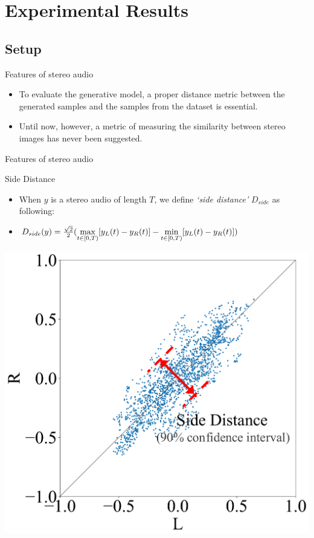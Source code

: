 \section{Experimental Results}
\subsection{Setup}

\begin{frame}{Features of stereo audio}
    \begin{itemize}
        \item To evaluate the generative model, a proper distance metric between the generated samples and the samples from the dataset is essential.
        \bigskip
        \bigskip
        \item Until now, however, a metric of measuring the similarity between stereo images has never been suggested.
    \end{itemize}
    
\end{frame}

\begin{frame}{Features of stereo audio}
    \begin{block}{Side Distance}
        \begin{itemize}
        \item When $y$ is a stereo audio of length $T$, we define \textit{`side distance'} $D_{side}$ as following:
        \item $ D_{side}(y) = {\sqrt{2} \over 2}(\underset{t \in [0, T)}{\max} [y_L(t) - y_R(t)] - \underset{t \in [0, T)}{\min} [y_L(t) - y_R(t)])$
        \end{itemize}
        \bigskip
        \bigskip
        \centering
        \includegraphics[width=0.4\linewidth]{assets/figures/scatter_38.pdf}
    \end{block}
\end{frame}

